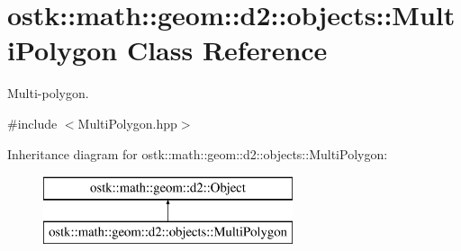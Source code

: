 \hypertarget{classostk_1_1math_1_1geom_1_1d2_1_1objects_1_1_multi_polygon}{}\section{ostk\+:\+:math\+:\+:geom\+:\+:d2\+:\+:objects\+:\+:Multi\+Polygon Class Reference}
\label{classostk_1_1math_1_1geom_1_1d2_1_1objects_1_1_multi_polygon}


Multi-\/polygon.  




{\ttfamily \#include $<$Multi\+Polygon.\+hpp$>$}

Inheritance diagram for ostk\+:\+:math\+:\+:geom\+:\+:d2\+:\+:objects\+:\+:Multi\+Polygon\+:\begin{figure}[H]
\begin{center}
\leavevmode
\includegraphics[height=2.000000cm]{classostk_1_1math_1_1geom_1_1d2_1_1objects_1_1_multi_polygon}
\end{center}
\end{figure}
